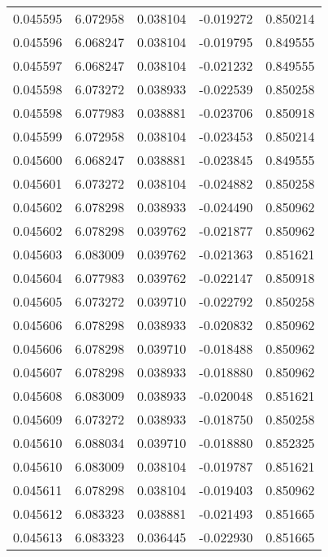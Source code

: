 \begin{tabular}{lrrrr}
0.045595    &  6.072958 &  0.038104 & -0.019272 &             0.850214 \\
0.045596    &  6.068247 &  0.038104 & -0.019795 &             0.849555 \\
0.045597    &  6.068247 &  0.038104 & -0.021232 &             0.849555 \\
0.045598    &  6.073272 &  0.038933 & -0.022539 &             0.850258 \\
0.045598    &  6.077983 &  0.038881 & -0.023706 &             0.850918 \\
0.045599    &  6.072958 &  0.038104 & -0.023453 &             0.850214 \\
0.045600    &  6.068247 &  0.038881 & -0.023845 &             0.849555 \\
0.045601    &  6.073272 &  0.038104 & -0.024882 &             0.850258 \\
0.045602    &  6.078298 &  0.038933 & -0.024490 &             0.850962 \\
0.045602    &  6.078298 &  0.039762 & -0.021877 &             0.850962 \\
0.045603    &  6.083009 &  0.039762 & -0.021363 &             0.851621 \\
0.045604    &  6.077983 &  0.039762 & -0.022147 &             0.850918 \\
0.045605    &  6.073272 &  0.039710 & -0.022792 &             0.850258 \\
0.045606    &  6.078298 &  0.038933 & -0.020832 &             0.850962 \\
0.045606    &  6.078298 &  0.039710 & -0.018488 &             0.850962 \\
0.045607    &  6.078298 &  0.038933 & -0.018880 &             0.850962 \\
0.045608    &  6.083009 &  0.038933 & -0.020048 &             0.851621 \\
0.045609    &  6.073272 &  0.038933 & -0.018750 &             0.850258 \\
0.045610    &  6.088034 &  0.039710 & -0.018880 &             0.852325 \\
0.045610    &  6.083009 &  0.038104 & -0.019787 &             0.851621 \\
0.045611    &  6.078298 &  0.038104 & -0.019403 &             0.850962 \\
0.045612    &  6.083323 &  0.038881 & -0.021493 &             0.851665 \\
0.045613    &  6.083323 &  0.036445 & -0.022930 &             0.851665 \\

\end{tabular}
